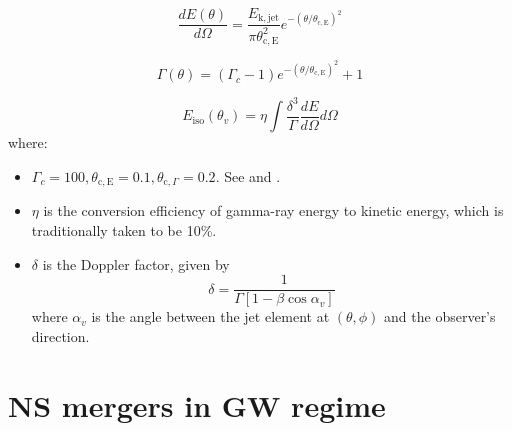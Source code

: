     \begin{equation}
        \dfrac{dE(\theta)}{d\Omega} =
            \dfrac{E_{\mathrm{k, jet}}}{\pi \theta_{\mathrm{c, E}}^2}
            e^{-(\theta/\theta_{\mathrm{c, E}})^2}
    \end{equation}

    \begin{equation}
        \Gamma(\theta) = (\Gamma_c - 1)e^{-(\theta/\theta_{\mathrm{c, E}})^2} + 1
    \end{equation}

    \begin{equation}
        E_{\mathrm{iso}}(\theta_v) =
            \eta \int \dfrac{\delta^3}{\Gamma} \dfrac{dE}{d\Omega} d\Omega
    \end{equation}
    where:

    \begin{itemize}

        \item $\Gamma_c = 100, \theta_{\mathrm{c, E}} = 0.1, \theta_{\mathrm{c}, \Gamma}
            = 0.2$.  See \cite{salafia_2015} and \cite{barbieri_2019}.

        \item $\eta$ is the conversion efficiency of gamma-ray energy to kinetic energy,
            which is traditionally taken to be 10\%.

        \item $\delta$ is the Doppler factor, given by $$\delta = \dfrac{1}{\Gamma[1 -
            \beta \cos \alpha_v]}$$ where $\alpha_v$ is the angle between the jet
            element at $(\theta, \phi)$ and the observer's direction.
    \end{itemize}

\section{NS mergers in GW regime}

